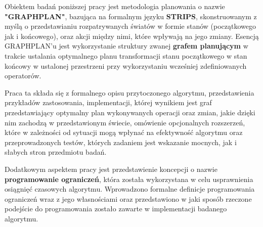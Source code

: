 \begin{streszczenie}
    Obiektem badań poniższej pracy jest metodologia planowania
    o nazwie \textbf{"GRAPHPLAN"}, bazująca na formalnym języku \textbf{STRIPS}, skonstruowanym z myślą o przedstawianiu 
    rozpatrywanych światów w formie stanów (początkowego jak i końcowego), 
    oraz akcji między nimi, które wpływają na jego zmiany.
    Esencją GRAPHPLAN'u jest wykorzystanie
    struktury zwanej \textbf{grafem planującym} w trakcie ustalania optymalnego planu transformacji
    stanu początkowego w stan końcowy w ustalonej przestrzeni przy wykorzystaniu wcześniej zdefiniowanych
    operatorów. 

    Praca ta składa się z formalnego opisu przytoczonego algorytmu, przedstawienia przykładów zastosowania,
    implementacji, której wynikiem jest graf przedstawiający optymalny plan wykonywanych operacji oraz zmian, jakie dzięki nim zachodzą w 
    przedstawionym świecie, omówienie opcjonalnych rozszerzeń, które w zależności od sytuacji mogą wpłynać na efektywność algorytmu
    oraz przeprowadzonych testów, których zadaniem jest wskazanie mocnych, jak i słabych stron przedmiotu badań. 

    Dodatkowym aspektem pracy jest przedstawienie koncepcji o nazwie \textbf{programowanie ograniczeń}, 
    która została wykorzystana w celu usprawnienia osiągnięć czasowych algorytmu. 
    Wprowadzono formalne definicje programowania ograniczeń wraz z jego własnościami oraz przedstawiono w jaki sposób rzeczone podejście do 
    programowania zostało zawarte w implementacji badanego algorytmu.

\end{streszczenie}
